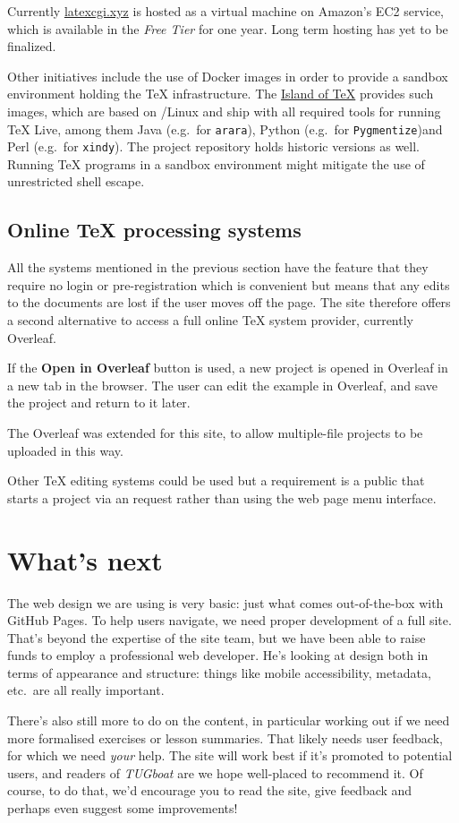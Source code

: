 \documentclass[harvardcite]{ltugboat}
\begin{document}
Currently \url{latexcgi.xyz} is hosted as a virtual machine on
Amazon's EC2 service, which is available in the \emph{Free Tier} for one
year. Long term hosting has yet to be finalized.

Other initiatives include the use of Docker images in order to provide
a sandbox environment holding the \TeX{} infrastructure. The
\href{https://gitlab.com/islandoftex/images}{Island of \TeX{}} provides
such images, which are based on /Linux and ship with all required
tools for running \TeX{} Live, among them Java (e.g.\ for \texttt{arara}),
Python (e.g.\ for \texttt{Pygmentize})and Perl (e.g.\ for \texttt{xindy}).
The project repository holds historic versions as well. Running \TeX{} programs
in a sandbox environment might mitigate the use of unrestricted shell escape.

\subsection{Online \TeX{} processing systems}

All the systems mentioned in the previous section have the feature that
they require no login or pre-registration which is convenient but
means that any edits to the documents are lost if the user moves off
the page.  The site therefore offers a second alternative to access a
full online \TeX{} system provider, currently Overleaf.

If the \textbf{Open in Overleaf} button is used, a new project is
opened in Overleaf in a new tab in the browser. The user can edit the
example in Overleaf, and save the project and return to it later.

The Overleaf  was extended for this site, to allow multiple-file
projects to be uploaded in this way.

Other \TeX{} editing systems could be used but a requirement is a
public  that starts a project via an  request rather than using
the web page menu interface.


\section{What's next}

The web design we are using is very basic: just what comes out-of-the-box with
GitHub Pages. To help users navigate, we need proper development of a full
site. That's beyond the expertise of the site team, but we have been able to
raise funds to employ a professional web developer. He's looking at design both
in terms of appearance and structure: things like mobile accessibility,
metadata, etc.\ are all really important.

There's also still more to do on the content, in particular working out if we
need more formalised exercises or lesson summaries. That likely needs user
feedback, for which we need \emph{your} help. The site will work best if it's
promoted to potential users, and readers of \emph{TUGboat} are we hope
well-placed to recommend it. Of course, to do that, we'd encourage you to read
the site, give feedback and perhaps even suggest some improvements!

\makesignature
\end{document}
